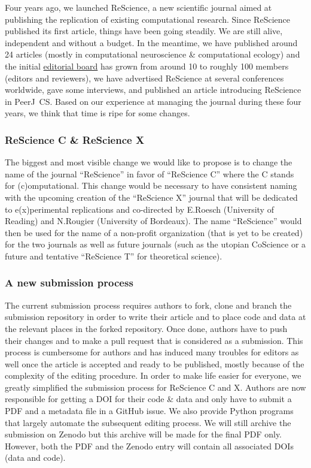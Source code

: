 Four years ago, we launched ReScience, a new scientific journal aimed at
publishing the replication of existing computational research. Since ReScience
published its first article\supercite{Topalidou:2015}, things have been going
steadily. We are still alive, independent and without a budget. In the
meantime, we have published around 24 articles (mostly in computational
neuroscience \& computational ecology) and the initial
\href{https://rescience-c.github.io/board/}{editorial board} has grown from
around 10 to roughly 100 members (editors and reviewers), we have advertised
ReScience at several conferences worldwide, gave some
interviews\supercite{Science:2018}, and published an article introducing
ReScience in PeerJ~CS\supercite{Rougier:2017}. Based on our
experience\supercite{Rougier:2018} at managing the journal during these four
years, we think that time is ripe for some changes.

\subsubsection{ReScience C \& ReScience X}

The biggest and most visible change we would like to propose is to change the
name of the journal ``ReScience'' in favor of ``ReScience C'' where the C
stands for (c)omputational. This change would be necessary to have consistent
naming with the upcoming creation of the ``ReScience X'' journal that will be
dedicated to e(x)perimental replications and co-directed by E.Roesch
(University of Reading) and N.Rougier (University of Bordeaux). The name
``ReScience'' would then be used for the name of a non-profit organization
(that is yet to be created) for the two journals as well as future journals
(such as the utopian CoScience\supercite{Rougier:2017} or a future and
tentative ``ReScience T'' for theoretical science).


\subsubsection{A new submission process}

The current submission process requires authors to fork, clone and branch the
submission repository in order to write their article and to place code and
data at the relevant places in the forked repository. Once done, authors have
to push their changes and to make a pull request that is considered as a
submission. This process is cumbersome for authors and has induced many
troubles for editors as well once the article is accepted and ready to be
published, mostly because of the complexity of the editing procedure. In order
to make life easier for everyone, we greatly simplified the submission process
for ReScience C and X. Authors are now responsible for getting a DOI for their
code \& data and only have to submit a PDF and a metadata file in a GitHub
issue.
We also provide Python programs that largely automate the subsequent editing
process. We will still archive the submission on Zenodo but this archive will
be made for the final PDF only. However, both the PDF and the Zenodo entry will
contain all associated DOIs (data and code).



